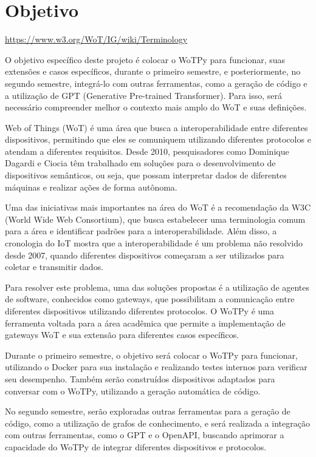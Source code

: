 
\section{Objetivo}

\url{https://www.w3.org/WoT/IG/wiki/Terminology}

O objetivo específico deste projeto é colocar o WoTPy para funcionar, suas extensões e casos específicos, durante o primeiro semestre, e posteriormente, no segundo semestre, integrá-lo com outras ferramentas, como a geração de código e a utilização de GPT (Generative Pre-trained Transformer). Para isso, será necessário compreender melhor o contexto mais amplo do WoT e suas definições.

Web of Things (WoT) é uma área que busca a interoperabilidade entre diferentes dispositivos, permitindo que eles se comuniquem utilizando diferentes protocolos e atendam a diferentes requisitos. Desde 2010, pesquisadores como Dominique Dagardi e Ciocia têm trabalhado em soluções para o desenvolvimento de dispositivos semânticos, ou seja, que possam interpretar dados de diferentes máquinas e realizar ações de forma autônoma.

Uma das iniciativas mais importantes na área do WoT é a recomendação da W3C (World Wide Web Consortium), que busca estabelecer uma terminologia comum para a área e identificar padrões para a interoperabilidade. Além disso, a cronologia do IoT mostra que a interoperabilidade é um problema não resolvido desde 2007, quando diferentes dispositivos começaram a ser utilizados para coletar e transmitir dados.

Para resolver este problema, uma das soluções propostas é a utilização de agentes de software, conhecidos como gateways, que possibilitam a comunicação entre diferentes dispositivos utilizando diferentes protocolos. O WoTPy é uma ferramenta voltada para a área acadêmica que permite a implementação de gateways WoT e sua extensão para diferentes casos específicos.

Durante o primeiro semestre, o objetivo será colocar o WoTPy para funcionar, utilizando o Docker para sua instalação e realizando testes internos para verificar seu desempenho. Também serão construídos dispositivos adaptados para conversar com o WoTPy, utilizando a geração automática de código.

No segundo semestre, serão exploradas outras ferramentas para a geração de código, como a utilização de grafos de conhecimento, e será realizada a integração com outras ferramentas, como o GPT e o OpenAPI, buscando aprimorar a capacidade do WoTPy de integrar diferentes dispositivos e protocolos.
